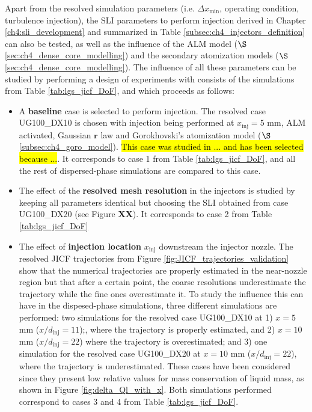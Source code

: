 Apart from the resolved simulation parameters (i.e. $\Delta x_\mathrm{min}$, operating condition, turbulence injection), the SLI parameters to perform injection derived in Chapter \ref{ch4:sli_development} and summarized in Table \ref{subsec:ch4_injectors_definition} can also be tested, as well as the influence of the ALM model ($\S$\ref{sec:ch4_dense_core_modelling}) and the secondary atomization models ($\S$\ref{sec:ch4_dense_core_modelling}). The influence of all these parameters can be studied by performing a design of experiments with consists of the simulations from Table \ref{tab:lgs_jicf_DoF}, and which proceeds as follows: 


\begin{itemize}

	\item A \textbf{baseline} case is selected to perform injection. The resolved case UG100\_DX10 is chosen with injection being performed at $x_\mathrm{inj} = 5$ mm, ALM activated, Gaussian $\textbf{r}$  law and Gorokhovski's atomization model ($\S$\ref{subsec:ch4_goro_model}). \hl{This case was studied in ... and has been selected because ...}. It corresponds to case 1 from Table \ref{tab:lgs_jicf_DoF}, and all the rest of dispersed-phase simulations are compared to this case.

		\item The effect of the \textbf{resolved mesh resolution} in the injectors is studied by keeping all parameters identical but choosing the SLI obtained from case UG100\_DX20 (see Figure \textbf{XX}). It corresponds to case 2 from Table \ref{tab:lgs_jicf_DoF}

	\item The effect of \textbf{injection location} $x_\mathrm{inj}$ downstream the injector nozzle. The resolved JICF trajectories from Figure \ref{fig:JICF_trajectories_validation} show that the numerical trajectories are properly estimated in the near-nozzle region but that after a certain point, the coarse resolutions underestimate the trajectory while the fine ones overestimate it. To study the influence this can have in the dispesed-phase simulations, three different simulations are performed: two simulations for the resolved case UG100\_DX10 at 1) $x = 5$ mm ($x/d_\mathrm{inj} = 11$);, where the trajectory is properly estimated, and 2) $x = 10$ mm ($x/d_\mathrm{inj} = 22$) where the trajectory is overestimated; and 3) one simulation for the resolved case UG100\_DX20 at $x = 10$ mm ($x/d_\mathrm{inj} = 22$), where the trajectory is underestimated. These cases have been considered since they present low relative values for mass conservation of liquid mass, as shown in Figure \ref{fig:delta_Ql_with_x}. Both simulations performed correspond to cases 3 and 4 from Table \ref{tab:lgs_jicf_DoF}.
	

\end{itemize}
